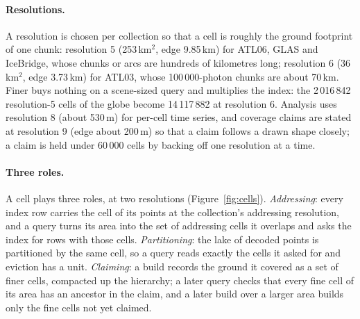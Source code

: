 \documentclass[10pt,a4paper]{article}
\begin{document}
\paragraph{Resolutions.} A resolution is chosen per collection so that a cell is roughly the ground footprint of
one chunk: resolution 5 (253\,km$^2$, edge 9.85\,km) for ATL06, GLAS and IceBridge, whose chunks or arcs are
hundreds of kilometres long; resolution 6 (36\,km$^2$, edge 3.73\,km) for ATL03, whose 100\,000-photon chunks are
about 70\,km. Finer buys nothing on a scene-sized query and multiplies the index: the 2\,016\,842 resolution-5
cells of the globe become 14\,117\,882 at resolution 6. Analysis uses resolution 8 (about 530\,m) for per-cell time
series, and coverage claims are stated at resolution 9 (edge about 200\,m) so that a claim follows a drawn shape
closely; a claim is held under 60\,000 cells by backing off one resolution at a time.

\paragraph{Three roles.} A cell plays three roles, at two resolutions (Figure~\ref{fig:cells}). \emph{Addressing}:
every index row carries the cell of its points at the collection's addressing resolution, and a query turns its
area into the set of addressing cells it overlaps and asks the index for rows with those cells.
\emph{Partitioning}: the lake of decoded points is partitioned by the same cell, so a query reads exactly the cells
it asked for and eviction has a unit. \emph{Claiming}: a build records the ground it covered as a set of finer
cells, compacted up the hierarchy; a later query checks that every fine cell of its area has an ancestor in the
claim, and a later build over a larger area builds only the fine cells not yet claimed.
\end{document}
